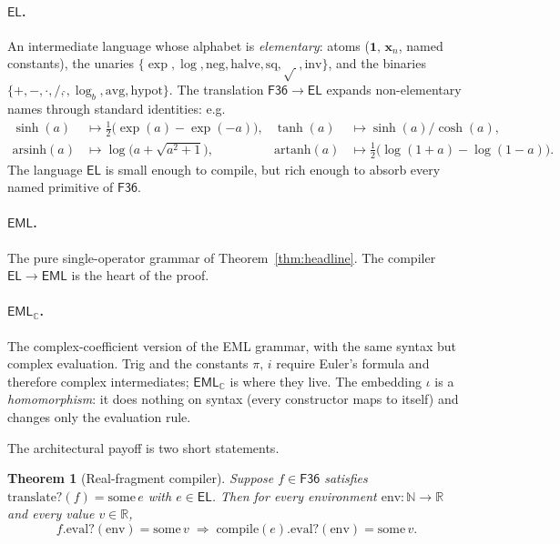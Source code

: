 \documentclass[11pt]{article}
\newcommand{\F}{\mathsf{F36}}
\newcommand{\EL}{\mathsf{EL}}
\newcommand{\EML}{\mathsf{EML}}
\newcommand{\EMLC}{\mathsf{EML}_{\mathbb{C}}}
\theoremstyle{plain}
\newtheorem{theorem}{Theorem}
\theoremstyle{definition}
\begin{document}
\paragraph{$\EL$.} An intermediate language whose alphabet is
\emph{elementary}: atoms ($\mathbf{1},\,\mathbf{x}_n$, named constants),
the unaries $\{\exp,\log,\mathrm{neg},\mathrm{halve},\mathrm{sq},\sqrt{\,},
\mathrm{inv}\}$, and the binaries $\{+,-,\cdot,/,\hat{},\log_b,
\mathrm{avg},\mathrm{hypot}\}$. The translation $\F \to \EL$ expands
non-elementary names through standard identities: e.g.
\begin{align*}
  \sinh(a) &\mapsto \tfrac{1}{2}\bigl(\exp(a) - \exp(-a)\bigr), &
  \tanh(a) &\mapsto \sinh(a) / \cosh(a), \\
  \mathrm{arsinh}(a) &\mapsto \log\bigl(a + \sqrt{a^2 + 1}\bigr), &
  \mathrm{artanh}(a) &\mapsto \tfrac{1}{2}\bigl(\log(1 + a) - \log(1 - a)\bigr).
\end{align*}
The language $\EL$ is small enough to compile, but rich enough to
absorb every named primitive of $\F$.

\paragraph{$\EML$.} The pure single-operator grammar of
Theorem~\ref{thm:headline}. The compiler $\EL \to \EML$ is the heart of
the proof.

\paragraph{$\EMLC$.} The complex-coefficient version of the EML
grammar, with the same syntax but complex evaluation. Trig and the
constants $\pi,\,i$ require Euler's formula and therefore complex
intermediates; $\EMLC$ is where they live. The embedding $\iota$ is a
\emph{homomorphism}: it does nothing on syntax (every constructor
maps to itself) and changes only the evaluation rule.

\medskip

The architectural payoff is two short statements.

\begin{theorem}[Real-fragment compiler]
\label{thm:real-compiler}
Suppose $f \in \F$ satisfies $\mathrm{translate?}(f) = \mathrm{some}\,e$
with $e \in \EL$. Then for every environment
$\mathrm{env}:\mathbb{N}\to\mathbb{R}$ and every value $v\in\mathbb{R}$,
\[
  f.\mathrm{eval?}(\mathrm{env}) = \mathrm{some}\,v
  \;\Longrightarrow\;
  \mathrm{compile}(e).\mathrm{eval?}(\mathrm{env}) = \mathrm{some}\,v.
\]
\end{theorem}
\end{document}
